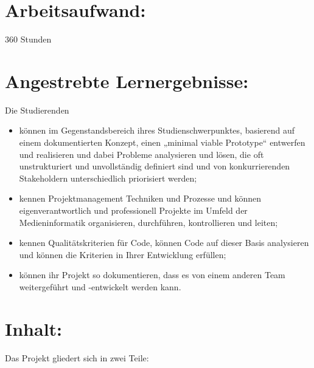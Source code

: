 \section*{Arbeitsaufwand:\label{/mi-2017/modulbeschreibungen-master/MA_Modul_Projekt_Entwicklung}}\label{arbeitsaufwandpathlabelmi-2017modulbeschreibungen-mastermaux5fmodulux5fprojektux5fentwicklung}

360 Stunden

\section*{Angestrebte
Lernergebnisse:\label{/mi-2017/modulbeschreibungen-master/MA_Modul_Projekt_Entwicklung}}\label{angestrebte-lernergebnissepathlabelmi-2017modulbeschreibungen-mastermaux5fmodulux5fprojektux5fentwicklung}

Die Studierenden

\begin{itemize}
\tightlist
\item
  können im Gegenstandsbereich ihres Studienschwerpunktes, basierend auf
  einem dokumentierten Konzept, einen „minimal viable Prototype``
  entwerfen und realisieren und dabei Probleme analysieren und lösen,
  die oft unstrukturiert und unvollständig definiert sind und von
  konkurrierenden Stakeholdern unterschiedlich priorisiert werden;
\item
  kennen Projektmanagement Techniken und Prozesse und können
  eigenverantwortlich und professionell Projekte im Umfeld der
  Medieninformatik organisieren, durchführen, kontrollieren und leiten;
\item
  kennen Qualitätskriterien für Code, können Code auf dieser Basis
  analysieren und können die Kriterien in Ihrer Entwicklung erfüllen;
\item
  können ihr Projekt so dokumentieren, dass es von einem anderen Team
  weitergeführt und -entwickelt werden kann.
\end{itemize}

\section*{Inhalt:\label{/mi-2017/modulbeschreibungen-master/MA_Modul_Projekt_Entwicklung}}\label{inhaltpathlabelmi-2017modulbeschreibungen-mastermaux5fmodulux5fprojektux5fentwicklung}

Das Projekt gliedert sich in zwei Teile:

